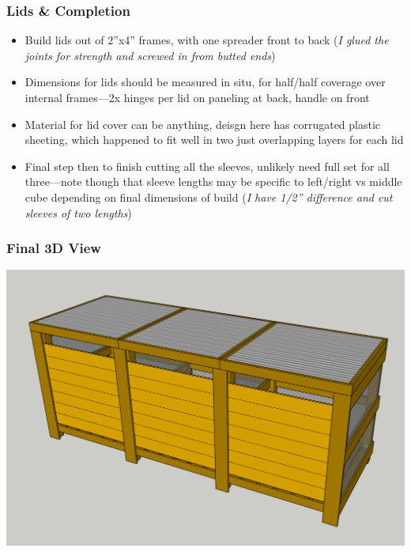 \documentclass{beamer}
\begin{document}
\begin{frame}
  \frametitle{Lids \& Completion}
  \begin{itemize}
  \item Build lids out of 2''x4'' frames, with one spreader front to back (\emph{I glued the joints for strength and screwed in from butted ends})
    \item Dimensions for lids should be measured in situ, for half/half coverage over internal frames---2x hinges per lid on paneling at back, handle on front
  \item Material for lid cover can be anything, deisgn here has corrugated plastic sheeting, which happened to fit well in two just overlapping layers for each lid
    \item Final step then to finish cutting all the sleeves, unlikely need full set for all three---note though that sleeve lengths may be specific to left/right vs middle cube depending on final dimensions of build (\emph{I have 1/2'' difference and cut sleeves of two lengths})
  \end{itemize}
\end{frame}

\begin{frame}
  \frametitle{Final 3D View}
  \begin{center}
  \includegraphics[width=.85\textwidth]{images/FrontPanels.png}
  \end{center}
\end{frame}
\end{document}
